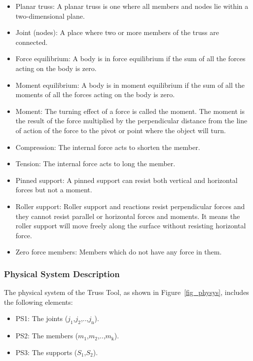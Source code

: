 \documentclass[12pt]{article}
\begin{document}
\begin{itemize}

\item{ Planar truss:  A planar truss is one where all members and nodes lie within a two-dimensional plane.} 
\item{Joint (nodes): A place where two or more  members of the truss  are connected.}
\item{Force equilibrium: A body is in force equilibrium if the sum of all the forces acting on the body is zero.}
\item{Moment equilibrium: A body is in moment equilibrium if the sum of all the moments of all the forces acting on the body is zero.}
\item{Moment: The turning effect of a force is called the moment. The moment is the result of the force multiplied by the perpendicular distance from the line of action of the force to the pivot or point where the object will turn.}
\item{Compression: The internal force acts to shorten the member.}
\item{Tension: The internal force acts to long the member.}
\item{Pinned support: A pinned support can resist both vertical and horizontal forces but not a moment. }
\item{Roller support: Roller support and reactions resist perpendicular forces and they cannot resist parallel or horizontal forces and moments. It means the roller support will move freely along the surface without resisting horizontal force. }
\item{Zero force members: Members which do not have any force in them.}
\end{itemize}

\subsubsection{Physical System Description} \label{sec_phySystDescrip}

The physical system of the Truss Tool, as shown in Figure~\ref{fig_physys},
includes the following elements:

\begin{itemize}

\item{PS1: The joints ($j_\text{1}$,$j_\text{2}$,..,$j_\text{n}$).}
\item{PS2: The members ($m_\text{1}$,$m_\text{2}$,..,$m_\text{k}$).}
\item{PS3: The supports ($S_\text{1}$,$S_\text{2}$).}

\end{itemize}
\end{document}
